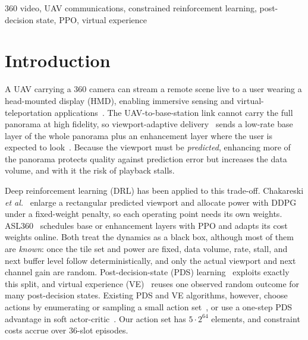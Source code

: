\documentclass[conference]{IEEEtran}
\begin{document}
\begin{IEEEkeywords}
360\textdegree{} video, UAV communications, constrained reinforcement learning, post-decision state, PPO, virtual experience
\end{IEEEkeywords}

\section{Introduction}

A UAV carrying a 360\textdegree{} camera can stream a remote scene live to a user wearing a head-mounted display (HMD), enabling immersive sensing and virtual-teleportation applications~\cite{chakareski2022spm,chakareski2025mmsp}. The UAV-to-base-station link cannot carry the full panorama at high fidelity, so viewport-adaptive delivery~\cite{corbillon2017viewport} sends a low-rate base layer of the whole panorama plus an enhancement layer where the user is expected to look~\cite{chakareski2025mmsp,mohammadhosseini2025asl360}. Because the viewport must be \emph{predicted}, enhancing more of the panorama protects quality against prediction error but increases the data volume, and with it the risk of playback stalls.

Deep reinforcement learning (DRL) has been applied to this trade-off. Chakareski \emph{et al.}~\cite{chakareski2025mmsp} enlarge a rectangular predicted viewport and allocate power with DDPG under a fixed-weight penalty, so each operating point needs its own weights. ASL360~\cite{mohammadhosseini2025asl360} schedules base or enhancement layers with PPO and adapts its cost weights online. Both treat the dynamics as a black box, although most of them are \emph{known}: once the tile set and power are fixed, data volume, rate, stall, and next buffer level follow deterministically, and only the actual viewport and next channel gain are random. Post-decision-state (PDS) learning~\cite{powell2011adp,mastronarde2011fast,sharma2020accelerated} exploits exactly this split, and virtual experience (VE)~\cite{mastronarde2013joint,sharma2020accelerated} reuses one observed random outcome for many post-decision states. Existing PDS and VE algorithms, however, choose actions by enumerating or sampling a small action set~\cite{corra2025lowcomplexity,mohammadhosseini2026stochastic}, or use a one-step PDS advantage in soft actor-critic~\cite{lu2026resource}. Our action set has $5\cdot2^{64}$ elements, and constraint costs accrue over 36-slot episodes.
\end{document}
